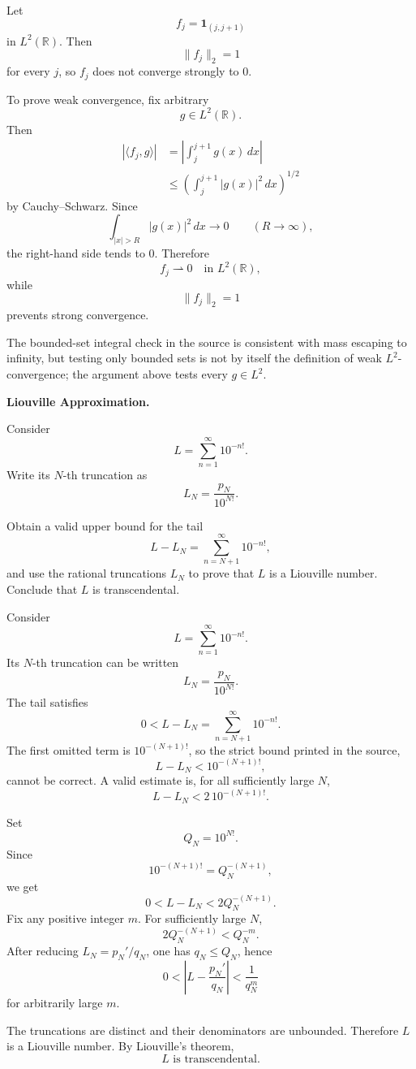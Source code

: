 \begin{solution}
Let
\[
f_j=\mathbf1_{(j,j+1)}
\]
in \(L^2(\mathbb R)\). Then
\[
\|f_j\|_2=1
\]
for every \(j\), so \(f_j\) does not converge strongly to \(0\).

To prove weak convergence, fix arbitrary
\[
g\in L^2(\mathbb R).
\]
Then
\[
\begin{aligned}
|\langle f_j,g\rangle|
&=
\left|
\int_j^{j+1}g(x)\,dx
\right|\\
&\le
\left(
\int_j^{j+1}|g(x)|^2\,dx
\right)^{1/2}
\end{aligned}
\]
by Cauchy--Schwarz. Since
\[
\int_{|x|>R}|g(x)|^2\,dx\longrightarrow0
\qquad(R\to\infty),
\]
the right-hand side tends to \(0\). Therefore
\[
\boxed{
f_j\rightharpoonup0
\quad\text{in }L^2(\mathbb R),
}
\]
while
\[
\boxed{
\|f_j\|_2=1
}
\]
prevents strong convergence.

The bounded-set integral check in the source is consistent with mass escaping to infinity,
but testing only bounded sets is not by itself the definition of weak \(L^2\)-convergence;
the argument above tests every \(g\in L^2\).
\end{solution}


\begin{problem}[CP-II-0316]
\label{prob:cp-ii-0316}
\textbf{Liouville Approximation.}

\hspace*{1.5em}Consider
\[
L=\sum_{n=1}^{\infty}10^{-n!}.
\]
Write its \(N\)-th truncation as
\[
L_N=\frac{p_N}{10^{N!}}.
\]

Obtain a valid upper bound for the tail
\[
L-L_N=\sum_{n=N+1}^{\infty}10^{-n!},
\]
and use the rational truncations \(L_N\) to prove that \(L\) is a
Liouville number. Conclude that \(L\) is transcendental.
\end{problem}

\begin{solution}
Consider
\[
L=\sum_{n=1}^{\infty}10^{-n!}.
\]
Its \(N\)-th truncation can be written
\[
L_N=\frac{p_N}{10^{N!}}.
\]
The tail satisfies
\[
0<L-L_N
=
\sum_{n=N+1}^{\infty}10^{-n!}.
\]
The first omitted term is \(10^{-(N+1)!}\), so the strict bound printed in the source,
\[
L-L_N<10^{-(N+1)!},
\]
cannot be correct. A valid estimate is, for all sufficiently large \(N\),
\[
L-L_N
<
2\,10^{-(N+1)!}.
\]

Set
\[
Q_N=10^{N!}.
\]
Since
\[
10^{-(N+1)!}
=
Q_N^{-(N+1)},
\]
we get
\[
0<L-L_N
<
2Q_N^{-(N+1)}.
\]
Fix any positive integer \(m\). For sufficiently large \(N\),
\[
2Q_N^{-(N+1)}
<
Q_N^{-m}.
\]
After reducing \(L_N=p_N'/q_N\), one has \(q_N\le Q_N\), hence
\[
0<
\left|
L-\frac{p_N'}{q_N}
\right|
<
\frac1{q_N^m}
\]
for arbitrarily large \(m\).

The truncations are distinct and their denominators are unbounded. Therefore \(L\) is a
Liouville number. By Liouville's theorem,
\[
\boxed{L\text{ is transcendental}.}
\]
\end{solution}


